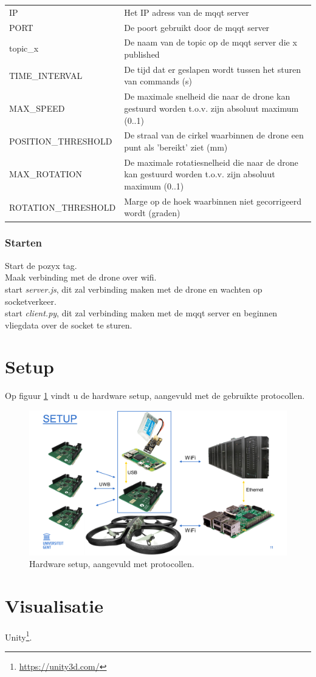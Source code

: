\begin{tabular}{ l | l }
IP & Het IP adress van de mqqt server\\
PORT & De poort gebruikt door de mqqt server\\
topic\_x & De naam van de topic op de mqqt server die x published\\
TIME\_INTERVAL & De tijd dat er geslapen wordt tussen het sturen van commands (s)\\
MAX\_SPEED & De maximale snelheid die naar de drone kan gestuurd worden t.o.v. zijn absoluut maximum (0..1)\\
POSITION\_THRESHOLD & De straal van de cirkel waarbinnen de drone een punt als 'bereikt' ziet (mm)\\
MAX\_ROTATION & De maximale rotatiesnelheid die naar de drone kan gestuurd worden t.o.v. zijn absoluut maximum (0..1)\\
ROTATION\_THRESHOLD & Marge op de hoek waarbinnen niet gecorrigeerd wordt (graden)\\
\end{tabular}




\subsubsection{Starten}


Start de pozyx tag.\\
Maak verbinding met de drone over wifi.\\
start \textit{server.js}, dit zal verbinding maken met de drone en wachten op socketverkeer.\\
start \textit{client.py}, dit zal verbinding maken met de mqqt server en beginnen vliegdata over de socket te sturen.\\


\section{Setup} \label{sec:setup}
Op figuur \ref{fig:setup} vindt u de hardware setup, aangevuld met de gebruikte protocollen.
\begin{figure}[p]
	\centering
	\includegraphics[width=\textwidth]{Setup}
	\caption[Setup]{Hardware setup, aangevuld met protocollen.}
	\label{fig:setup}
\end{figure}

\section{Visualisatie} \label{sec:visualization}
Unity\footnote{\url{https://unity3d.com/}}.